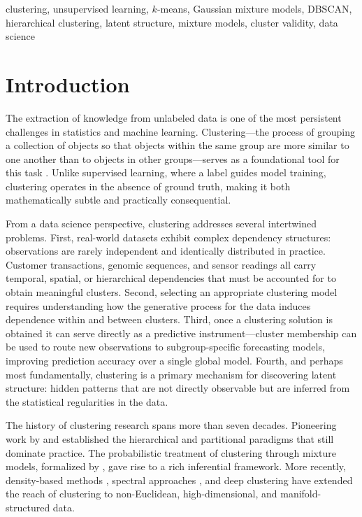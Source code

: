 \documentclass[conference]{IEEEtran}
\begin{document}
\begin{IEEEkeywords}
clustering, unsupervised learning, $k$-means, Gaussian mixture models, DBSCAN, hierarchical clustering, latent structure, mixture models, cluster validity, data science
\end{IEEEkeywords}

\section{Introduction}

The extraction of knowledge from unlabeled data is one of the most persistent challenges in statistics and machine learning. Clustering---the process of grouping a collection of objects so that objects within the same group are more similar to one another than to objects in other groups---serves as a foundational tool for this task \cite{jain1999data}. Unlike supervised learning, where a label guides model training, clustering operates in the absence of ground truth, making it both mathematically subtle and practically consequential.

From a data science perspective, clustering addresses several intertwined problems. First, real-world datasets exhibit complex dependency structures: observations are rarely independent and identically distributed in practice. Customer transactions, genomic sequences, and sensor readings all carry temporal, spatial, or hierarchical dependencies that must be accounted for to obtain meaningful clusters. Second, selecting an appropriate clustering model requires understanding how the generative process for the data induces dependence within and between clusters. Third, once a clustering solution is obtained it can serve directly as a predictive instrument---cluster membership can be used to route new observations to subgroup-specific forecasting models, improving prediction accuracy over a single global model. Fourth, and perhaps most fundamentally, clustering is a primary mechanism for discovering latent structure: hidden patterns that are not directly observable but are inferred from the statistical regularities in the data.

The history of clustering research spans more than seven decades. Pioneering work by \citeauthor{ward1963hierarchical} \cite{ward1963hierarchical} and \citeauthor{macqueen1967methods} \cite{macqueen1967methods} established the hierarchical and partitional paradigms that still dominate practice. The probabilistic treatment of clustering through mixture models, formalized by \citeauthor{mclachlan2000finite} \cite{mclachlan2000finite}, gave rise to a rich inferential framework. More recently, density-based methods \cite{ester1996density}, spectral approaches \cite{ng2002spectral}, and deep clustering \cite{xie2016unsupervised} have extended the reach of clustering to non-Euclidean, high-dimensional, and manifold-structured data.
\end{document}
